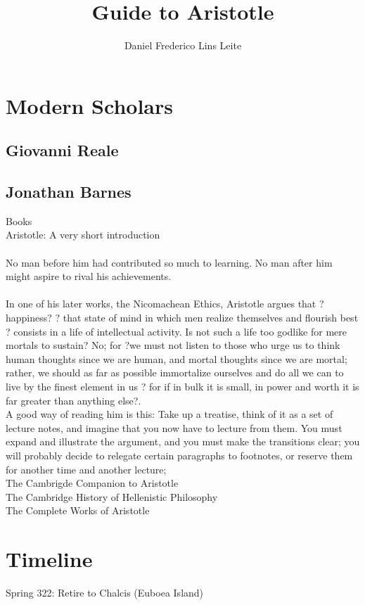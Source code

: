 \documentclass[10pt,a4paper]{book}
\author{Daniel Frederico Lins Leite}
\title{Guide to Aristotle}
\begin{document}
	\chapter{Modern Scholars}
	
	\section{Giovanni Reale}
	
	
	
	\section{Jonathan Barnes}
	
	Books\\
	Aristotle: A very short introduction\\
	\\
	No man before him had contributed so much to learning. No man after him might aspire to rival his achievements.\\
	\\
	In one of his later works, the 	Nicomachean Ethics, Aristotle argues that ?happiness? ? that state of 	mind in which men realize themselves and flourish best ? consists in a 	life of intellectual activity. Is not such a life too godlike for mere 	mortals to sustain? No; for ?we must not listen to those who urge us to 	think human thoughts since we are human, and mortal thoughts since 	we are mortal; rather, we should as far as possible immortalize 	ourselves and do all we can to live by the finest element in us ? for if in bulk it is small, in power and worth it is far greater than anything else?.
	\\
	A good way of reading him is this: Take up 	a treatise, think of it as a set of lecture notes, and imagine that you now have to lecture from them. You must expand and illustrate the argument, and you must make the transitions clear; you will probably decide to relegate certain paragraphs to footnotes, or reserve them for another time and another lecture;
	\\
	The Cambrigde Companion to Aristotle\\
	The Cambridge History of Hellenistic Philosophy\\
	The Complete Works of Aristotle
	
	\chapter{Timeline}
	
	Spring 322: Retire to Chalcis (Euboea Island)
\end{document}
